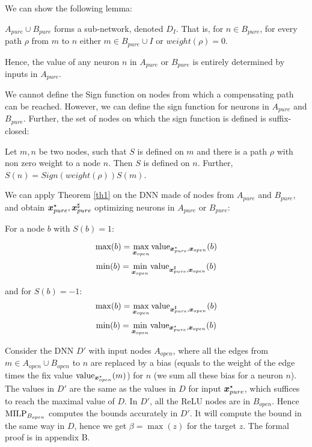 We can show the following lemma:

\begin{lemma}
	$A_{pure} \cup B_{pure} $ forms a sub-network, denoted $D_I$. That is, 
	for $n \in B_{pure}$, for every path $\rho$ from $m$ to $n$
	either $m \in B_{pure}\cup I$ or $weight(\rho)=0$.
\end{lemma}

Hence, the value of any neuron $n$ in $A_{pure}$ or $B_{pure}$ is entirely determined by 
inputs in $A_{pure}$. 


We cannot define the Sign function on nodes from which a compensating path can be reached.
However, we can define the sign function for neurons in $A_{pure}$ and $B_{pure}$.
Further, the set of nodes on which the sign function is defined is suffix-closed:

\begin{lemma}
	Let $m,n$ be two nodes, such that $S$ is defined on $m$ and there is a path $\rho$ with non zero weight to a node $n$. Then $S$ is defined on $n$.
	Further, $S(n)= Sign(weight(\rho)) S(m)$.
\end{lemma}

We can apply Theorem \ref{th1} on the DNN made of nodes from $A_{pure}$ and $B_{pure}$, and obtain $\boldsymbol{x}_{pure}^\star,\boldsymbol{x}_{pure}^\sharp$ optimizing neurons in $A_{pure}$ or $B_{pure}$:

\begin{proposition}
For a node $b$ with $S(b)=1$:

$$\max(b)=\max_{\boldsymbol{x}_{open}} {\textrm{value}}_{\boldsymbol{x}^{\star}_{pure},\boldsymbol{x}_{open}}(b)$$
$$\min(b)=\min_{\boldsymbol{x}_{open}} {\textrm{value}}_{\boldsymbol{x}^{\sharp}_{pure},\boldsymbol{x}_{open}}(b)$$

and for $S(b)=-1$:
$$\max(b)=\max_{\boldsymbol{x}_{open}} {\textrm{value}}_{\boldsymbol{x}^{\sharp}_{pure},\boldsymbol{x}_{open}}(b)$$
$$\min(b)=\min_{\boldsymbol{x}_{open}} {\textrm{value}}_{\boldsymbol{x}^{\star}_{pure},\boldsymbol{x}_{open}}(b)$$
\end{proposition}

Consider the DNN $D'$ with input nodes $A_{open}$, where all the 
edges from $m \in A_{open} \cup B_{open}$ to $n$ are replaced by a bias 
(equals to the weight of the edge times the fix value ${\textrm{value}}_{\boldsymbol{x}^\star_{open}}(m)$) for $n$ (we sum all these bias for a neuron $n$).
The values in $D'$ are the same as the values in $D$ for input $\boldsymbol{x}^{\star}_{pure}$,
which suffices to reach the maximal value of $D$.
In $D'$, all the ReLU nodes are in $B_{open}$. 
Hence ${\textrm{MILP}}_{B_{open}}$ computes the bounds accurately in $D'$.
It will compute the bound in the same way in $D$, hence we get $\beta=\max(z)$ for the target $z$. The formal proof is in appendix B.



